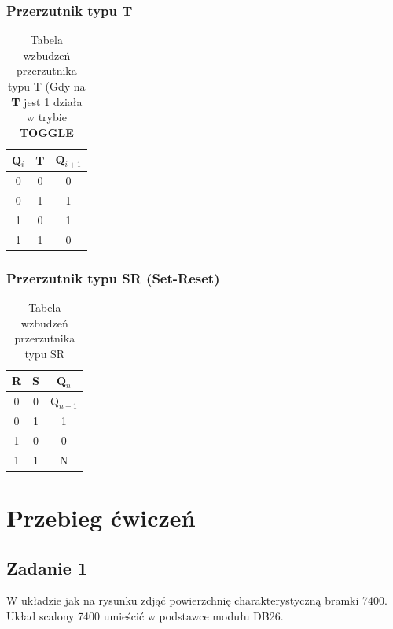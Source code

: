 \documentclass{article}
\begin{document}
\begin{minipage}[b]{0.48\textwidth} %
	\subsubsection*{Przerzutnik typu T}
	\begin{table}[H]
		\centering
		\begin{tabular}{|c|c|c|}
			\hline
			\textbf{Q$_i$} & \textbf{T} & \textbf{Q$_{i+1}$} \\ \hline
			0 & 0 & 0 \vphantom{Q$_{n-1}$} \\ %
			0 & 1 & 1 \\ 
			1 & 0 & 1 \\ 
			1 & 1 & 0 \\ 
			\hline
		\end{tabular}
		\caption{Tabela wzbudzeń przerzutnika typu T (Gdy na \textbf{T} jest 1 działa w trybie \textbf{TOGGLE}}
	\end{table}
\end{minipage}
\hfill 
\begin{minipage}[b]{0.48\textwidth} %
	\subsubsection*{Przerzutnik typu SR (Set-Reset)}
	\begin{table}[H]
		\centering
		\begin{tabular}{|c|c|c|}
			\hline
			\textbf{R} & \textbf{S} & \textbf{Q$_n$} \\ \hline
			0 & 0 & Q$_{n-1}$ \\ %
			0 & 1 & 1 \\ 
			1 & 0 & 0 \\ 
			1 & 1 & N \\ 
			\hline
		\end{tabular}
		\caption{Tabela wzbudzeń przerzutnika typu SR}
	\end{table}
\end{minipage}
    

    \pagebreak

\pagebreak
\section{Przebieg ćwiczeń}
\subsection{Zadanie 1}
W układzie jak na rysunku zdjąć powierzchnię charakterystyczną bramki 7400. Układ
scalony 7400 umieścić w podstawce modułu DB26.
\end{document}
